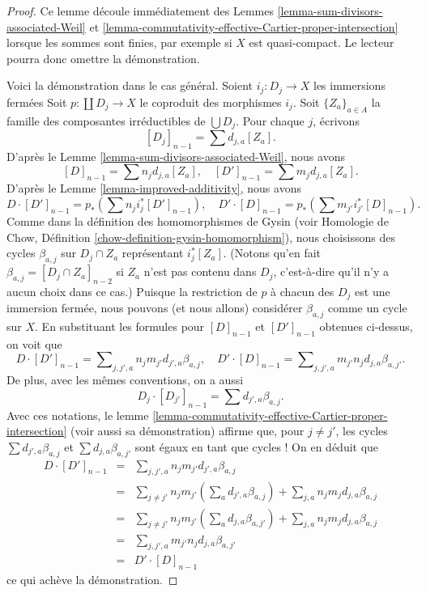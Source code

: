 \begin{proof}
Ce lemme découle immédiatement des
Lemmes \ref{lemma-sum-divisors-associated-Weil} et
\ref{lemma-commutativity-effective-Cartier-proper-intersection}
lorsque les sommes sont finies, par exemple si $X$ est quasi-compact.
Le lecteur pourra donc omettre la démonstration.

\medskip\noindent
Voici la démonstration dans le cas général.
Soient $i_j : D_j \to X$ les immersions fermées
Soit $p : \coprod D_j \to X$ le coproduit des morphismes $i_j$.
Soit $\{Z_a\}_{a \in A}$ la famille des composantes irréductibles de
$\bigcup D_j$. Pour chaque $j$, écrivons
$$
[D_j]_{n - 1} = \sum d_{j, a}[Z_a].
$$
D'après le Lemme \ref{lemma-sum-divisors-associated-Weil}, nous avons
$$
[D]_{n - 1} = \sum n_j d_{j, a} [Z_a],
\quad
[D']_{n - 1} = \sum m_j d_{j, a} [Z_a].
$$
D'après le Lemme \ref{lemma-improved-additivity},
nous avons
$$
D \cdot [D']_{n - 1} = p_*\left(\sum n_j i_j^*[D']_{n - 1} \right),
\quad
D' \cdot [D]_{n - 1} = p_*\left(\sum m_{j'} i_{j'}^*[D]_{n - 1} \right).
$$
Comme dans la définition des homomorphismes de Gysin (voir
Homologie de Chow, Définition \ref{chow-definition-gysin-homomorphism}),
nous choisissons des cycles $\beta_{a, j}$ sur $D_j \cap Z_a$ représentant
$i_j^*[Z_a]$. (Notons qu'en fait $\beta_{a, j} = [D_j \cap Z_a]_{n - 2}$
si $Z_a$ n'est pas contenu dans $D_j$, c'est-à-dire qu'il n'y a aucun choix dans ce cas.)
Puisque la restriction de $p$ à chacun des $D_j$ est une immersion fermée,
nous pouvons (et nous allons) considérer $\beta_{a, j}$ comme un cycle sur $X$.
En substituant les formules pour $[D]_{n - 1}$ et $[D']_{n - 1}$ obtenues
ci-dessus, on voit que
$$
D \cdot [D']_{n - 1} =
\sum\nolimits_{j, j', a} n_j m_{j'} d_{j', a} \beta_{a, j},
\quad
D' \cdot [D]_{n - 1} =
\sum\nolimits_{j, j', a} m_{j'} n_j d_{j, a} \beta_{a, j'}.
$$
De plus, avec les mêmes conventions, on a aussi
$$
D_j \cdot [D_{j'}]_{n - 1} = \sum d_{j', a} \beta_{a, j}.
$$
Avec ces notations, le
lemme \ref{lemma-commutativity-effective-Cartier-proper-intersection}
(voir aussi sa démonstration)
affirme que, pour $j \not = j'$, les cycles
$\sum d_{j', a} \beta_{a, j}$ et $\sum d_{j, a} \beta_{a, j'}$
sont égaux en tant que cycles ! On en déduit que
\begin{eqnarray*}
D \cdot [D']_{n - 1}
& = &
\sum\nolimits_{j, j', a} n_j m_{j'} d_{j', a} \beta_{a, j} \\
& = &
\sum\nolimits_{j \not = j'} n_j m_{j'}
\left(\sum\nolimits_a d_{j', a} \beta_{a, j}\right) +
\sum\nolimits_{j, a} n_j m_j d_{j, a} \beta_{a, j} \\
& = &
\sum\nolimits_{j \not = j'} n_j m_{j'}
\left(\sum\nolimits_a d_{j, a} \beta_{a, j'}\right) +
\sum\nolimits_{j, a} n_j m_j d_{j, a} \beta_{a, j} \\
& = &
\sum\nolimits_{j, j', a} m_{j'} n_j d_{j, a} \beta_{a, j'} \\
& = &
D' \cdot [D]_{n - 1}
\end{eqnarray*}
ce qui achève la démonstration.
\end{proof}


